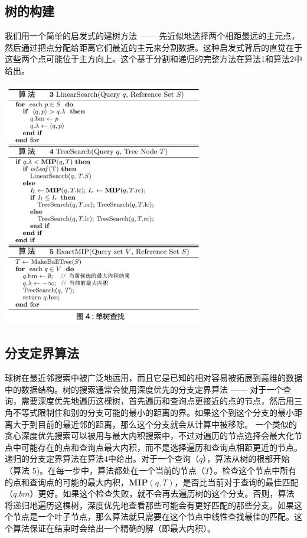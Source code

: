 \documentclass[twocolumn]{article}
\begin{document}
\subsection{树的构建}

我们用一个简单的启发式的建树方法 ------ 先近似地选择两个相距最远\cite{28}的主元点，然后通过把点分配给距离它们最近的主元来分割数据。这种启发式背后的直觉在于这些两个点可能位于主方向上。这个基于分割和递归的完整方法在算法1和算法2中给出。

\includegraphics[width=250pt,clip,trim=10 0 0 0]{fig04.jpg}

\subsection{分支定界算法}

球树在最近邻搜索中被广泛地运用，而且它是已知的相对容易被拓展到高维\cite{28, 26}的数据中的数据结构。树的搜索通常会使用深度优先的分支定界算法 ------ 对于一个查询，需要深度优先地遍历这棵树，首先遍历和查询点更接近的点的节点，然后用三角不等式限制住和别的分支可能的最小的距离的界。如果这个到这个分支的最小距离大于到目前的最近邻的距离，那么这个分支就会从计算中被移除。
一个类似的贪心深度优先搜索可以被用与最大内积搜索中，不过对遍历的节点选择会最大化节点中可能存在的点和查询点最大内积，而不是选择遍历和查询点相距更近的节点。递归的分支定界算法在算法4中给出。对于一个查询（$q$），算法从树的根部开始（算法 5)。在每一步中，算法都处在一个当前的节点（$T$）。检查这个节点中所有的点和查询点的可能的最大内积，$\mathbf{MIP}(q,T)$，是否比当前对于查询的最佳匹配（$q.bm$）更好。如果这个检查失败，就不会再去遍历树的这个分支。否则，算法将递归地遍历这棵树，深度优先地查看那些可能会有更好匹配的那些分支。如果这个节点是一个叶子节点，那么算法就只需要在这个节点中线性查找最佳的匹配。这个算法保证在结束时会给出一个精确的解（即最大内积）。
\end{document}
